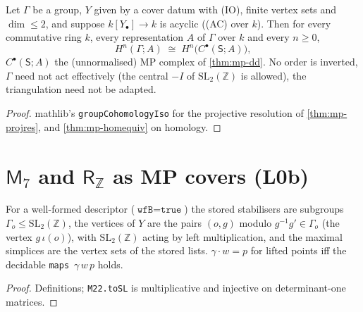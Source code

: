 \begin{theorem}\label{thm:mp-comparison}
  \leanok
  Let $\Gamma$ be a group, $Y$ given by a cover datum with (IO), finite vertex sets and $\dim\le2$, and suppose $k[Y_\bullet]\to k$ is
  acyclic ((AC) over $k$).  Then for every commutative ring $k$, every representation $A$ of $\Gamma$ over $k$ and every $n\ge0$,
  \[
    H^n(\Gamma;A)\;\cong\;H^n\bigl(C^\bullet(\mathsf S;A)\bigr),
  \]
  $C^\bullet(\mathsf S;A)$ the (unnormalised) MP complex of \ref{thm:mp-dd}.  No order is inverted, $\Gamma$ need not act effectively
  (the central $-I$ of $\mathrm{SL}_2(\mathbb Z)$ is allowed), the triangulation need not be adapted.
\end{theorem}
\begin{proof}
  \leanok
  mathlib's \texttt{groupCohomologyIso} for the projective resolution of \ref{thm:mp-projres}, and \ref{thm:mp-homequiv} on homology.
\end{proof}

\section{$\mathsf M_7$ and $\mathsf R_{\mathbb Z}$ as MP covers (L0b)}

\begin{definition}\label{def:mp-datum-cover}
  \leanok
  For a well-formed descriptor ($\texttt{wfB}=\texttt{true}$) the stored stabilisers are subgroups $\Gamma_o\le\mathrm{SL}_2(\mathbb Z)$,
  the vertices of $Y$ are the pairs $(o,g)$ modulo $g^{-1}g'\in\Gamma_o$ (the vertex $g\,\iota(o)$), with $\mathrm{SL}_2(\mathbb Z)$ acting by
  left multiplication, and the maximal simplices are the vertex sets of the stored lists.  $\gamma\cdot w=p$ for lifted points iff
  the decidable \texttt{maps}~$\gamma\,w\,p$ holds.
\end{definition}
\begin{proof}
  \leanok
  Definitions; \texttt{M22.toSL} is multiplicative and injective on determinant-one matrices.
\end{proof}


